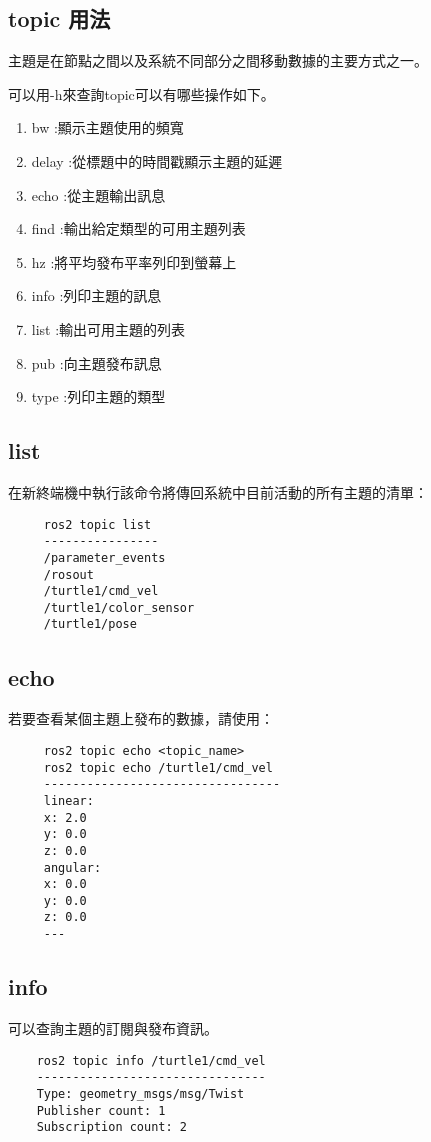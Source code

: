 \subsection{topic 用法}
主題是在節點之間以及系統不同部分之間移動數據的主要方式之一。

可以用-h來查詢topic可以有哪些操作如下。
\begin{enumerate}
\item  bw     :顯示主題使用的頻寬
\item  delay  :從標題中的時間戳顯示主題的延遲
\item  echo   :從主題輸出訊息
\item  find   :輸出給定類型的可用主題列表
\item  hz     :將平均發布平率列印到螢幕上
\item  info   :列印主題的訊息
\item  list   :輸出可用主題的列表
\item  pub    :向主題發布訊息
\item  type   :列印主題的類型
\end{enumerate}

\subsection{list}
在新終端機中執行該命令將傳回系統中目前活動的所有主題的清單：
 \begin{verbatim}
     ros2 topic list 
     ----------------
     /parameter_events
     /rosout
     /turtle1/cmd_vel
     /turtle1/color_sensor
     /turtle1/pose
\end{verbatim}

\subsection{echo}
若要查看某個主題上發布的數據，請使用：

 \begin{verbatim}
     ros2 topic echo <topic_name>
     ros2 topic echo /turtle1/cmd_vel
     ---------------------------------
     linear:
     x: 2.0
     y: 0.0
     z: 0.0
     angular:
     x: 0.0
     y: 0.0
     z: 0.0
     ---
\end{verbatim}
\subsection{info}
可以查詢主題的訂閱與發布資訊。
\begin{verbatim}
    ros2 topic info /turtle1/cmd_vel
    --------------------------------
    Type: geometry_msgs/msg/Twist
    Publisher count: 1
    Subscription count: 2
\end{verbatim}


